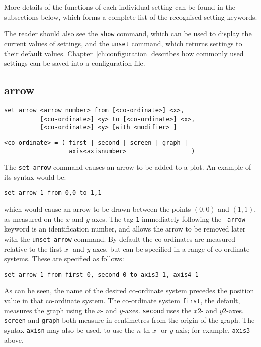\noindent
More details of the functions of each individual setting can be found in the
subsections below, which forms a complete list of the recognised setting
keywords.

The reader should also see the {\tt show} command, which can be used to display
the current values of settings, and the {\tt unset} command, which returns
settings to their default values. Chapter~\ref{ch:configuration} describes how
commonly used settings can be saved into a configuration file.

\subsection{arrow}

\begin{verbatim}
set arrow <arrow number> from [<co-ordinate>] <x>,
          [<co-ordinate>] <y> to [<co-ordinate>] <x>,
          [<co-ordinate>] <y> [with <modifier> ]
\end{verbatim}

\begin{verbatim}
<co-ordinate> = ( first | second | screen | graph |
                  axis<axisnumber>                  )
\end{verbatim}

The {\tt set arrow} command causes an arrow to be added to a plot. An example of
its syntax would be:

\begin{verbatim}
set arrow 1 from 0,0 to 1,1
\end{verbatim}

\noindent which would cause an arrow to be drawn between the points $(0,0)$ and $(1,1)$, as
measured on the $x$ and $y$ axes.  The tag {\tt 1} immediately following the {\tt
arrow} keyword is an identification number, and allows the arrow to be removed
later with the {\tt unset arrow} command.  By default the co-ordinates are
measured relative to the first $x$- and $y$-axes, but can be specified in a range
of co-ordinate systems. These are specified as follows:

\begin{verbatim}
set arrow 1 from first 0, second 0 to axis3 1, axis4 1
\end{verbatim}

As can be seen, the name of the desired co-ordinate system precedes the position
value in that co-ordinate system. The co-ordinate system {\tt first}, the default,
measures the graph using the $x$- and $y$-axes. {\tt second} uses the $x2$- and
$y2$-axes.  {\tt screen} and {\tt graph} both measure in centimetres from the
origin of the graph.  The syntax {\tt axisn} may also be
used, to use the $n$ th $x$- or $y$-axis; for example, {\tt axis3} above.

